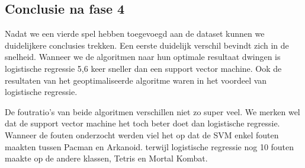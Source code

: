 \subsection{Conclusie na fase 4}
Nadat we een vierde spel hebben toegevoegd aan de dataset kunnen we duidelijkere conclusies trekken. Een eerste duidelijk verschil bevindt zich in de snelheid. Wanneer we de algoritmen naar hun optimale resultaat dwingen is logistische regressie 5,6 keer sneller dan een support vector machine. Ook de resultaten van het geoptimaliseerde algoritme waren in het voordeel van logistische regressie. 

De foutratio's van beide algoritmen verschillen niet zo super veel. We merken wel dat de support vector machine het toch beter doet dan logistische regressie. Wanneer de fouten onderzocht werden viel het op dat de SVM enkel fouten maakten tussen Pacman en Arkanoid. terwijl logistische regressie nog 10 fouten maakte op de andere klassen, Tetris en Mortal Kombat. 

 